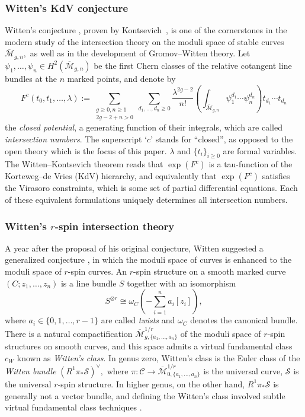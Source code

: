 \documentclass[11pt]{amsart}
\theoremstyle{definition}
\theoremstyle{remark}
\newcommand{\<}{\left<}
\renewcommand{\>}{\right>}
\numberwithin{equation}{section}
\def\Mbar{{\overline{\mathcal M}}}
\begin{document}
\subsubsection{Witten's KdV conjecture}
Witten's conjecture \cite{Witten2DGravity}, proven by Kontsevich~\cite{Kontsevich}, is one of the cornerstones in the modern study of the intersection theory on the moduli space of stable curves~$\Mbar_{g,n},$ as well as in the development of Gromov--Witten theory. Let $\psi_1, \ldots, \psi_n \in H^2(\Mbar_{g,n})$ be the first Chern classes of the relative cotangent line bundles at the $n$ marked points, and denote by
\[
F^c(t_0,t_1,\ldots,\lambda) := \sum_{\substack{g \geq 0, n\geq 1\\2g-2+n>0}} \sum_{d_1,\ldots,d_n\geq 0} \frac{\lambda^{2g-2}}{n!}\left(\int_{\Mbar_{g,n}} \psi_1^{d_1} \cdots \psi_n^{d_n} \right)t_{d_1} \cdots t_{d_n}
\]
the \emph{closed potential}, a generating function of their integrals, which are called \emph{intersection numbers}. The superscript `$c$' stands for ``closed'', as opposed to the open theory which is the focus of this paper.  $\lambda$ and $\{t_i\}_{i\ge 0}$  are formal variables.  The Witten--Kontsevich theorem reads that $\exp(F^c)$ is a tau-function of the Korteweg--de Vries (KdV) hierarchy, and equivalently that  $\exp(F^c)$ satisfies the Virasoro constraints, which is some set of partial differential equations. Each of these equivalent formulations uniquely determines all intersection numbers.
\subsubsection{Witten's $r$-spin intersection theory}
A year after the proposal of his original conjecture, Witten suggested a generalized conjecture \cite{Witten93}, in which the moduli space of curves is enhanced to the moduli space of $r$-spin curves.  An $r$-spin structure on a smooth marked curve $(C;z_1, \ldots, z_n)$ is a line bundle $S$ together with an isomorphism
\[S^{\otimes r} \cong \omega_{C}\left(-\sum_{i=1}^n a_i[z_i]\right),\]
where $a_i \in \{0,1,\ldots, r-1\}$ are called \emph{twists} and $\omega_C$ denotes the canonical bundle.  There is a natural compactification $\Mbar_{g,\{a_1, \ldots, a_n\}}^{1/r}$ of the moduli space of $r$-spin structures on smooth curves, and this space admits a virtual fundamental class $c_W$ known as \emph{Witten's class}. In genus zero, Witten's class is the Euler class of the \emph{Witten bundle} $(R^1\pi_*\mathcal{S})^{\vee},$ where $\pi: \mathcal{C} \rightarrow \Mbar_{0,\{a_1, \ldots, a_n\}}^{1/r}$ is the universal curve, $\mathcal{S}$ is the universal $r$-spin structure.  In higher genus, on the other hand, $R^1\pi_*\mathcal{S}$ is generally not a vector bundle, and defining the Witten's class involved subtle virtual fundamental class techniques \cite{PV,ChiodoWitten,Moc06,FJR,CLL}.
\end{document}
